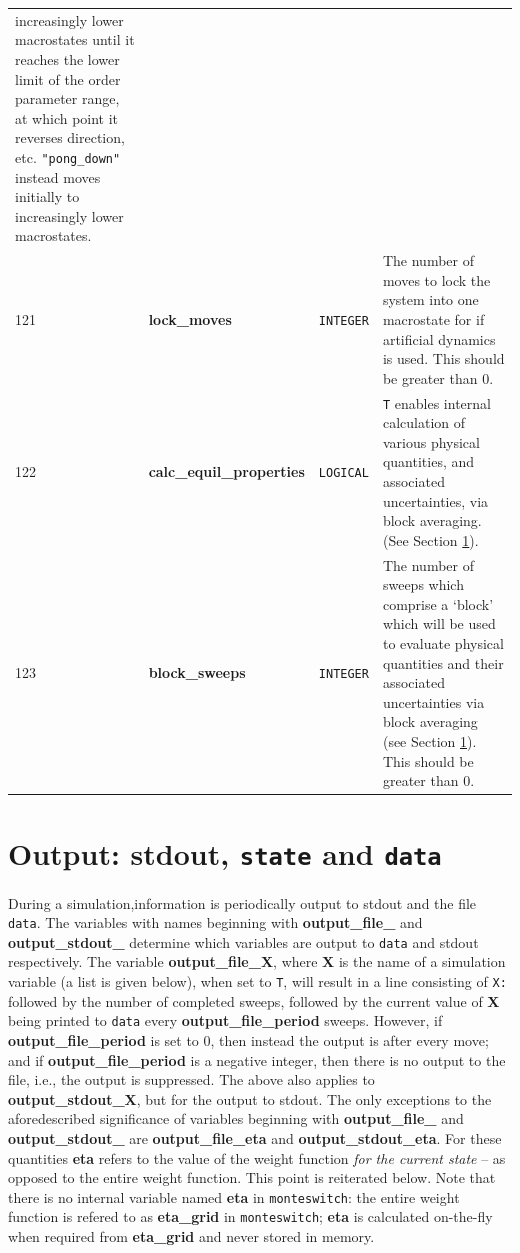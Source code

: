 \documentclass{report}
\begin{document}
\begin{landscape}
\begin{center}
\begin{longtable}{l l l p{8cm}}
increasingly lower macrostates until it reaches the lower limit of the order parameter range, at which point it reverses direction, etc. 
\texttt{"pong\_down"}
instead moves initially to increasingly lower macrostates.  \\
121 & \textbf{lock\_moves}  &  \texttt{INTEGER}  & The number of moves to lock the system into one macrostate for if artificial dynamics is used. 
This should be greater than 0. \\
122 & \textbf{calc\_equil\_properties}  &  \texttt{LOGICAL}  & \texttt{T} enables internal calculation of various physical quantities, and associated
uncertainties, via block averaging. (See Section \ref{sec:output}). \\
123 & \textbf{block\_sweeps}  &  \texttt{INTEGER}  & The number of sweeps which comprise a `block' which will be used to evaluate physical quantities and
their associated uncertainties via block averaging (see Section \ref{sec:output}). This should be greater than 0. \\
\end{longtable}
\end{center}
\end{landscape}


\section{Output: stdout, \texttt{state} and \texttt{data}}\label{sec:output}
During a simulation,information is periodically output to stdout and the file \texttt{data}. The variables with names beginning with 
\textbf{output\_file\_} and \textbf{output\_stdout\_} determine which variables are output to \texttt{data} and stdout respectively.
The variable \textbf{output\_file\_X}, where \textbf{X} is the name of a simulation variable (a list is given below), when set to \texttt{T}, 
will result in a line consisting of \texttt{X: } followed by the number of completed sweeps, followed by the current value of \textbf{X} 
being printed to \texttt{data} every \textbf{output\_file\_period} sweeps. However, if \textbf{output\_file\_period} is set to 0, then instead 
the output is after every move; and if \textbf{output\_file\_period} is a negative integer, then there is no output to the file, i.e., the
output is suppressed. The above also applies to \textbf{output\_stdout\_X}, but for the output to stdout. 
The only exceptions to the aforedescribed significance of variables beginning with \textbf{output\_file\_} and \textbf{output\_stdout\_}
are \textbf{output\_file\_eta} and \textbf{output\_stdout\_eta}. For these quantities \textbf{eta} refers to the
value of the weight function \emph{for the current state} -- as opposed to the entire weight function. This point is reiterated below.
Note that there is no internal variable named \textbf{eta} in \verb|monteswitch|: the entire weight function is refered to as \textbf{eta\_grid}
in \verb|monteswitch|; \textbf{eta} is calculated on-the-fly when required from \textbf{eta\_grid} and never stored in memory.
\end{document}
